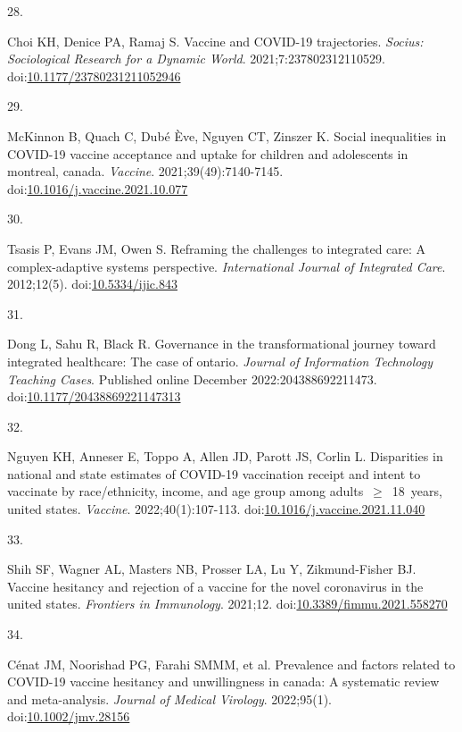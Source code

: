 \documentclass[
  letterpaper,
  DIV=11,
  numbers=noendperiod]{scrartcl}
\newlength{\cslhangindent}
\newlength{\csllabelwidth}
\newlength{\cslentryspacingunit} %
\newenvironment{CSLReferences}[2] %
 {%
  \setlength{\parindent}{0pt}
  \ifodd #1
  \let\oldpar\par
  \def\par{\hangindent=\cslhangindent\oldpar}
  \fi
  \setlength{\parskip}{#2\cslentryspacingunit}
 }%
 {}
\newcommand{\CSLLeftMargin}[1]{\parbox[t]{\csllabelwidth}{#1}}
\newcommand{\CSLRightInline}[1]{\parbox[t]{\linewidth - \csllabelwidth}{#1}\break}
\begin{document}
\begin{CSLReferences}{0}{0}
\leavevmode{}%
\CSLLeftMargin{28. }%
\CSLRightInline{Choi KH, Denice PA, Ramaj S. Vaccine and {COVID}-19
trajectories. \emph{Socius: Sociological Research for a Dynamic World}.
2021;7:237802312110529.
doi:\href{https://doi.org/10.1177/23780231211052946}{10.1177/23780231211052946}}

\leavevmode{}%
\CSLLeftMargin{29. }%
\CSLRightInline{McKinnon B, Quach C, Dubé Ève, Nguyen CT, Zinszer K.
Social inequalities in {COVID}-19 vaccine acceptance and uptake for
children and adolescents in montreal, canada. \emph{Vaccine}.
2021;39(49):7140-7145.
doi:\href{https://doi.org/10.1016/j.vaccine.2021.10.077}{10.1016/j.vaccine.2021.10.077}}

\leavevmode{}%
\CSLLeftMargin{30. }%
\CSLRightInline{Tsasis P, Evans JM, Owen S. Reframing the challenges to
integrated care: A complex-adaptive systems perspective.
\emph{International Journal of Integrated Care}. 2012;12(5).
doi:\href{https://doi.org/10.5334/ijic.843}{10.5334/ijic.843}}

\leavevmode{}%
\CSLLeftMargin{31. }%
\CSLRightInline{Dong L, Sahu R, Black R. Governance in the
transformational journey toward integrated healthcare: The case of
ontario. \emph{Journal of Information Technology Teaching Cases}.
Published online December 2022:204388692211473.
doi:\href{https://doi.org/10.1177/20438869221147313}{10.1177/20438869221147313}}

\leavevmode{}%
\CSLLeftMargin{32. }%
\CSLRightInline{Nguyen KH, Anneser E, Toppo A, Allen JD, Parott JS,
Corlin L. Disparities in national and state estimates of {COVID}-19
vaccination receipt and intent to vaccinate by race/ethnicity, income,
and age group among adults~\(\geq\)~18~years, united states.
\emph{Vaccine}. 2022;40(1):107-113.
doi:\href{https://doi.org/10.1016/j.vaccine.2021.11.040}{10.1016/j.vaccine.2021.11.040}}

\leavevmode{}%
\CSLLeftMargin{33. }%
\CSLRightInline{Shih SF, Wagner AL, Masters NB, Prosser LA, Lu Y,
Zikmund-Fisher BJ. Vaccine hesitancy and rejection of a vaccine for the
novel coronavirus in the united states. \emph{Frontiers in Immunology}.
2021;12.
doi:\href{https://doi.org/10.3389/fimmu.2021.558270}{10.3389/fimmu.2021.558270}}

\leavevmode{}%
\CSLLeftMargin{34. }%
\CSLRightInline{Cénat JM, Noorishad PG, Farahi SMMM, et al. Prevalence
and factors related to {COVID}-19 vaccine hesitancy and unwillingness in
canada: A systematic review and meta-analysis. \emph{Journal of Medical
Virology}. 2022;95(1).
doi:\href{https://doi.org/10.1002/jmv.28156}{10.1002/jmv.28156}}


\end{CSLReferences}
\end{document}
